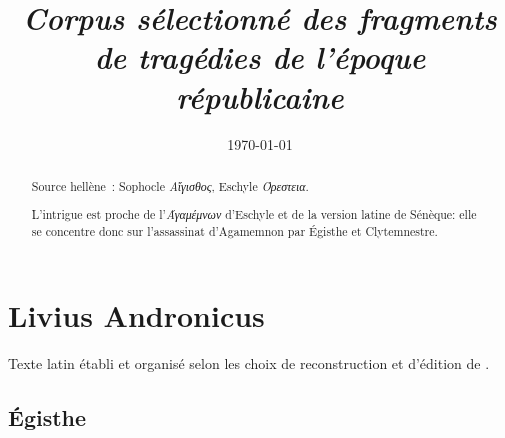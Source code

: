\documentclass[12pt,onecolumn,twoside,a4paper]{memoir}
\title{\textit{Corpus sélectionné des fragments de tragédies de l'époque républicaine}}
\author{}
\date{\today}
\begin{document}
            
         
            \section{Livius Andronicus}
            Texte latin établi et organisé selon les choix de reconstruction et d'édition de \cite{TrRF_I_2012}.\par
            
               \subsection*{Égisthe}
               \begin{abstract}
                  Source hellène : Sophocle \textit{Αἴγισθος}, Eschyle
                        \textit{Όρεστεια}.\par
                   L'intrigue est proche de l'\textit{Άγαμέμνων} d'Eschyle
                     et de la version latine de Sénèque: elle se concentre donc sur l'assassinat
                     d'Agamemnon par Égisthe et Clytemnestre.\par
               \end{abstract}
\end{document}
